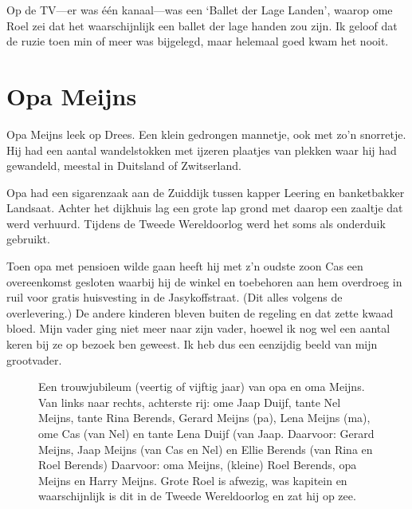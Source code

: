\documentclass[12pt,twoside, openright]{memoir}
\begin{document}
Op de TV---er was één kanaal---was een `Ballet der Lage Landen', waarop ome Roel zei dat het waarschijnlijk een ballet der lage handen zou zijn. Ik geloof dat de ruzie toen min of meer was bijgelegd, maar helemaal goed kwam het nooit.  
\nopagebreak

\section*{Opa Meijns} %
\label{cha:opa_meijns}

Opa Meijns leek op Drees. Een klein gedrongen mannetje, ook met zo’n snorretje. Hij had een aantal wandelstokken met ijzeren plaatjes van plekken waar hij had gewandeld, meestal in Duitsland of Zwitserland.

Opa had een sigarenzaak aan de Zuiddijk tussen kapper Leering en banketbakker Landsaat. Achter het dijkhuis lag een grote lap grond met daarop een zaaltje dat werd verhuurd. Tijdens de Tweede Wereldoorlog werd het soms als onderduik gebruikt. 

Toen opa met pensioen wilde gaan heeft hij met z’n oudste zoon Cas een overeenkomst gesloten waarbij hij de winkel en toebehoren aan hem overdroeg in ruil voor gratis huisvesting in de Jasykoffstraat. (Dit alles volgens de overlevering.) De andere kinderen bleven buiten de regeling en dat zette kwaad bloed. Mijn vader ging niet meer naar zijn vader, hoewel ik nog wel een aantal keren bij ze op bezoek ben geweest. Ik heb dus een eenzijdig beeld van mijn grootvader.

\begin{figure}
\caption*{\footnotesize Een trouwjubileum (veertig of vijftig jaar) van opa en oma Meijns. Van links naar rechts, achterste rij: ome Jaap Duijf, tante Nel Meijns, tante Rina Berends, Gerard Meijns (pa), Lena Meijns (ma), ome Cas (van Nel) en tante Lena Duijf (van Jaap.
Daarvoor: Gerard Meijns, Jaap Meijns (van Cas en Nel) en Ellie Berends (van Rina en Roel Berends)
Daarvoor: oma Meijns, (kleine) Roel Berends, opa Meijns en Harry Meijns. Grote Roel is afwezig, was kapitein en waarschijnlijk is dit in de Tweede Wereldoorlog en zat hij op zee.}
\end{figure}
\end{document}
